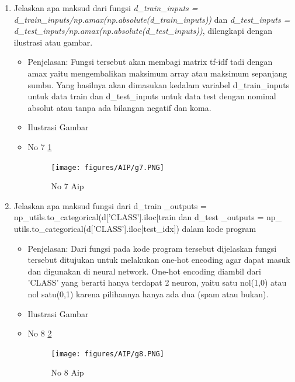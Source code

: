 \begin{enumerate}
\item Jelaskan apa maksud dari fungsi \emph{d\_train\_inputs = d\_train\_inputs/np.amax(np.absolute(d\_train\_inputs))} dan \emph{d\_test\_inputs = d\_test\_inputs/np.amax(np.absolute(d\_test\_inputs))}, dilengkapi dengan ilustrasi atau gambar.
\begin{itemize}
\item Penjelasan: Fungsi tersebut akan membagi matrix tf-idf tadi dengan amax yaitu mengembalikan maksimum array atau maksimum sepanjang sumbu. Yang hasilnya akan dimasukan kedalam variabel d\_train\_inputs untuk data train dan d\_test\_inputs untuk data test dengan nominal absolut atau tanpa ada bilangan negatif dan koma.
\par 
\par
\item Ilustrasi Gambar
\item No 7 \ref{teori7}
\begin{figure}[!hbtp]
\centering
\texttt{[image: figures/AIP/g7.PNG]}
\caption{No 7 Aip}
\label{teori7}
\end{figure}
\par
\end{itemize}
\par
\par

\item Jelaskan apa maksud fungsi dari d\_train \_outputs = np\_utils.to\_categorical(d['CLASS'].iloc[train dan d\_test \_outputs = np\_ utils.to\_categorical(d['CLASS'].iloc[test\_idx]) dalam kode program
\begin{itemize}
\item Penjelasan: Dari fungsi pada kode program tersebut dijelaskan fungsi tersebut ditujukan untuk melakukan one-hot encoding agar dapat masuk dan digunakan di neural network. One-hot encoding diambil dari 'CLASS' yang berarti hanya terdapat 2 neuron, yaitu satu nol(1,0) atau nol satu(0,1) karena pilihannya hanya ada dua (spam atau bukan).
\par 
\par
\item Ilustrasi Gambar
\item No 8 \ref{teori8}
\begin{figure}[!hbtp]
\centering
\texttt{[image: figures/AIP/g8.PNG]}
\caption{No 8 Aip}
\label{teori8}
\end{figure}
\par
\end{itemize}
\par
\par


\end{enumerate}
